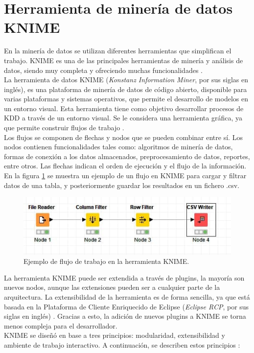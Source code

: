 \section{Herramienta de minería de datos KNIME}

En la minería de datos se utilizan diferentes herramientas que simplifican el trabajo. KNIME es una de las principales herramientas de minería y análisis de datos, siendo muy completa y ofreciendo muchas funcionalidades \citep{Lisandra2012}. \\
La herramienta de datos KNIME (\textit{Konstanz Information Miner}, por sus siglas en inglés), es una plataforma de minería de datos de código abierto, disponible para varias plataformas y sistemas operativos, que permite el desarrollo de modelos en un entorno visual. Esta herramienta tiene como objetivo desarrollar procesos de KDD a través de un entorno visual. Se le considera una herramienta gráfica, ya que permite construir flujos de trabajo \citep{KNIME2023}. \\
Los flujos se componen de flechas y nodos que se pueden combinar entre sí. Los nodos contienen funcionalidades tales como: algoritmos de minería de datos, formas de conexión a los datos almacenados, preprocesamiento de datos, reportes, entre otros. Las flechas indican el orden de ejecución y el flujo de la información. En la figura \ref{fig:ejemploworkflow} se muestra un ejemplo de un flujo en KNIME para cargar y filtrar datos de una tabla, y posteriormente guardar los resultados en un fichero .csv. 
\begin{figure}[H]
	\centering
	\includegraphics[width=0.9\linewidth]{figuras/capi 1/ejemplo_workflow}
	\caption{Ejemplo de flujo de trabajo en la herramienta KNIME.}
	\label{fig:ejemploworkflow}
\end{figure}

La herramienta KNIME puede ser extendida a través de plugins, la mayoría son nuevos nodos, aunque las extensiones pueden ser a cualquier parte de la arquitectura. La extensibilidad de la herramienta es de forma sencilla, ya que está basada en la Plataforma de Cliente Enriquecido de Eclipse (\textit{Eclipse RCP}, por sus siglas en inglés) \citep{berthold2009knime}. Gracias a esto, la adición de nuevos plugins a KNIME se torna menos compleja para el desarrollador. \\
KNIME se diseñó en base a tres principios: modularidad, extensibilidad y ambiente de trabajo interactivo. A continuación, se describen estos principios \citep{Lisandra2012}:

